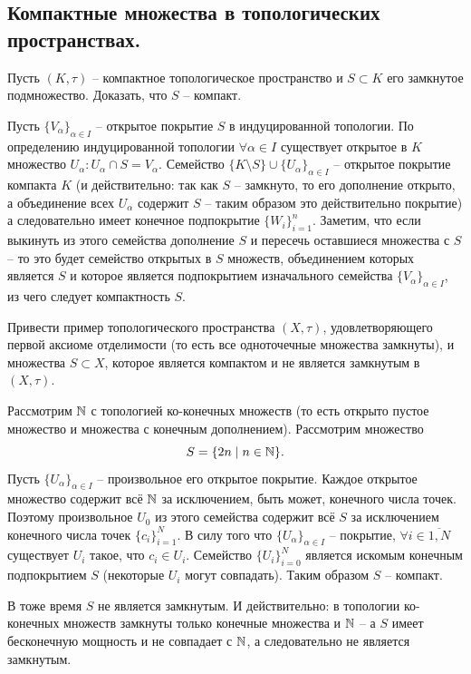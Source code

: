 \subsection{Компактные множества в топологических пространствах.}
\begin{task}[Т1]
    Пусть $(K, \tau)$ -- компактное топологическое пространство и $S \subset K$ его замкнутое подмножество. Доказать, что $S$ -- компакт.
\end{task}
\begin{solve}
    Пусть $\{V_\alpha\}_{\alpha \in I}$ -- открытое покрытие $S$ в индуцированной топологии. По определению индуцированной топологии $\forall \alpha \in I$ существует открытое в $K$ множество $U_\alpha\colon U_\alpha \cap S = V_\alpha$. Семейство $\{K \setminus S\} \cup \{U_\alpha\}_{\alpha \in I}$ -- открытое покрытие компакта $K$ (и действительно: так как $S$ -- замкнуто, то его дополнение открыто, а объединение всех $U_\alpha$ содержит $S$ -- таким образом это действительно покрытие) а следовательно имеет конечное подпокрытие $\{W_{i}\}_{i = 1}^n$. Заметим, что если выкинуть из этого семейства дополнение $S$ и пересечь оставшиеся множества с $S$ -- то это будет семейство открытых в $S$ множеств, объединением которых является $S$ и которое является подпокрытием изначального семейства $\{V_\alpha\}_{\alpha \in I}$, из чего следует компактность $S$.
\end{solve}
\begin{task}[Т2]
    Привести пример топологического пространства $(X, \tau)$, удовлетворяющего первой аксиоме отделимости (то есть все одноточечные множества замкнуты), и множества $S \subset X$, которое является компактом и не является замкнутым в $(X, \tau)$.
\end{task}
\begin{solve}
    Рассмотрим $\mathbb{N}$ с топологией ко-конечных множеств (то есть открыто пустое множество и множества с конечным дополнением). Рассмотрим множество \[S = \{2n \mid n \in \mathbb{N}\}.\]
    Пусть $\{U_{\alpha}\}_{\alpha \in I}$ -- произвольное его открытое покрытие. Каждое открытое множество содержит всё $\mathbb{N}$ за исключением, быть может, конечного числа точек. Поэтому произвольное $U_0$ из этого семейства содержит всё $S$ за исключением конечного числа точек $\{c_i\}_{i = 1}^{N}$. В силу того что $\{U_\alpha\}_{\alpha \in I}$ -- покрытие, $\forall i \in \overline{1, N}$ существует $U_i$ такое, что $c_i \in U_i$. Семейство $\{U_i\}_{i = 0}^{N}$ является искомым конечным подпокрытием $S$ (некоторые $U_i$ могут совпадать). Таким образом $S$ -- компакт.

    В тоже время $S$ не является замкнутым. И действительно: в топологии ко-конечных множеств замкнуты только конечные множества и $\mathbb{N}$ -- а $S$ имеет бесконечную мощность и не совпадает с $\mathbb{N}$, а следовательно не является замкнутым.
\end{solve}
